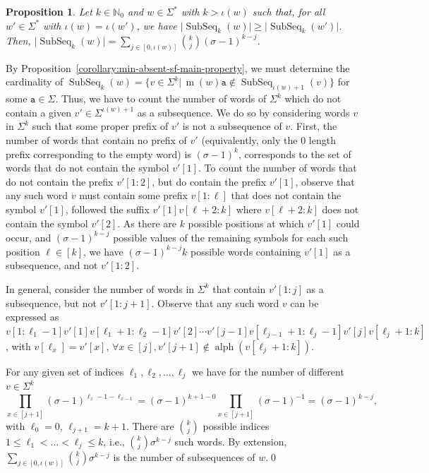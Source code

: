 \documentclass[10pt,a4paper]{amsart}
\makeatletter
\newcommand{\N}{\mathbb{N}}
\def\ta{\mathtt{a}}
\def\m{\operatorname{m}}
\DeclareMathOperator\ScatFact{SubSeq}
\DeclareMathOperator{\letters}{alph}
\newif\ifpaper
\theoremstyle{plain}
\newtheorem{proposition}{Proposition}
\theoremstyle{definition}
\renewenvironment{proof}[1][\proofname]{\par
  \pushQED{}%
  \normalfont \topsep6\p@\@plus6\p@\relax
  \trivlist
  \item[\hskip\labelsep\itshape #1\@addpunct{.}]\ignorespaces
}{%
  \popQED\endtrivlist\@endpefalse
}
\makeatother
\begin{document}
\begin{proposition}
    \label{proposition:min-absent-sf-count-max-factors}
    Let $k\in\N_0$ and $w \in \Sigma^*$ with $k > \iota(w)$ such that, for all $w' \in \Sigma^*$ with $\iota(w) = \iota(w')$, we have $\vert \ScatFact_k(w) \vert \geq \vert \ScatFact_k(w') \vert$. Then,
    $\vert \ScatFact_k(w) \vert = \sum_{j \in [0, \iota(w)]} \binom{k}{j} (\sigma-1)^{k - j}.$
\end{proposition}
\ifpaper
\else
\begin{proof}
	By Proposition~\ref{corollary:min-absent-sf-main-property}, we must determine the cardinality of 
	$\ScatFact_k(w)=\{v\in\Sigma^k|\,\m(w)\ta\not\in\ScatFact_{\iota(w)+1}(v)\}$ for some $\ta \in \Sigma$. Thus, we have to count the number of words of $\Sigma^k$ which do not contain a given $v'\in\Sigma^{\iota(w)+1}$ as a subsequence. We do so by considering words $v$ in $\Sigma^k$ such that some proper prefix of $v'$ is not a subsequence of $v$.
	First, the number of words that contain no prefix of $v'$ (equivalently, only the $0$ length prefix corresponding to the empty word) is $(\sigma - 1)^k$, corresponds to the set of words that do not contain the symbol $v'[1]$. 
	To count the number of words that do not contain the prefix $v'[1: 2]$, but do contain the prefix $v'[1]$, observe that any such word $v$ must contain some prefix $v[1:\ell]$ that does not contain the symbol $v'[1]$, followed the suffix $v'[1] v[\ell + 2:k]$ where $v[\ell + 2: k]$ does not contain the symbol $v'[2]$.  As there are $k$ possible positions at which $v'[1]$ could occur, and $(\sigma - 1)^{k - j}$ possible values of the remaining symbols for each such position $\ell \in [k]$, we have $(\sigma - 1)^{k - j} k$ possible words containing $v'[1]$ as a subsequence, and not $v'[1: 2]$.
	
	In general, consider the number of words in $\Sigma^k$ that contain $v'[1: j]$ as a subsequence, but not $v'[1: j + 1]$. Observe that any such word $v$ can be expressed as $v[1: \ell_1 - 1] v'[1] v[\ell_1 + 1: \ell_2 - 1] v'[2] \cdots v'[j - 1] v[\ell_{j - 1} + 1: \ell_j - 1] v'[j] v[\ell_{j} + 1: k]$, with $v[\ell_{x}] = v'[x]$, $\forall x \in [j], v'[j+1]\not\in\letters(v[\ell_j+1:k])$.
	
	For any given set of indices $\ell_1, \ell_2, \dots, \ell_j$ we have for the number of different $v\in\Sigma^k$ 
	\[
	\prod_{x \in [j + 1]}(\sigma - 1)^{\ell_{x} - 1 - \ell_{x - 1}} = (\sigma - 1)^{k+1 - 0} \prod_{x \in [j + 1]} (\sigma-1)^{-1} = (\sigma - 1)^{k-j}, 
	\]
	with $\ell_0 = 0$, $\ell_{j + 1} = k+1$. 
	There are $\binom{k}{j}$ possible indices $ 1 \leq \ell_1 < \dots < \ell_{j} \leq k$, i.e., $\binom{k}{j} \sigma^{k - j}$ such words. By extension, $\sum_{j \in [0, 
		\iota(w)]} \binom{k}{j} \sigma^{k - j}$ is the number of subsequences of $w$.\qed
\end{proof}
\fi
\end{document}
